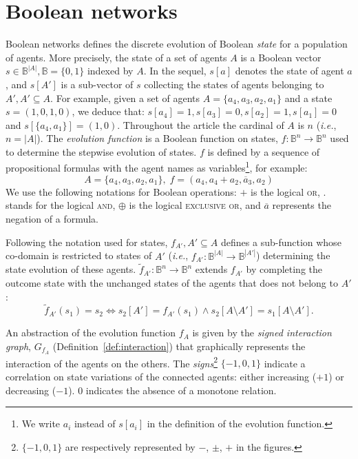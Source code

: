 \documentclass[12pt]{elsarticle}
\newcommand{\Bset}[0]{\mathbb{B}}
\newcommand{\abbrev}[1]{#1, \relax}
\newcommand{\ie}[0]{\abbrev{\textit{i.e.}}}
\renewcommand{\land}[0]{.}
\renewcommand{\lor}[0]{+}
\renewcommand{\lnot}[1]{\overline{#1}}
\newcommand{\lxor}[0]{\oplus}
\begin{document}
\section{Boolean networks}
\label{sec:discrete-dynamics}
Boolean networks defines the discrete evolution of Boolean \emph{state} for a population of agents. More precisely, the state of a set of agents $A$ is a Boolean vector $s \in \Bset^{|A|}, \Bset=\{0,1\}$ indexed by $A$. In the sequel, $s[a]$ denotes the state of agent $a$, and $s[A']$ is a sub-vector of $s$ collecting the states of agents belonging to $A', A' \subseteq A$. For example, given a set of agents $A=\{a_4,a_3,a_2,a_1\}$ and a state $s=(1,0,1,0)$, we deduce that: $s[a_4]=1,s[a_3]=0,s[a_2]=1,s[a_1]=0$ and $s[\{a_4,a_1\}]=(1,0)$. Throughout the article the cardinal of $A$ is $n$ (\ie $n=|A|$). The \emph{ evolution function} is a Boolean function on states, $f:\Bset^{n} \to \Bset^{n}$ used to determine the stepwise evolution of states. $f$ is  defined by a sequence of propositional formulas with the agent names as variables\footnote{We write $a_i$ instead of $s[a_i]$ in the definition of the evolution function.}, for example:
\begin{equation}
\label{eq:ex1}
A = \{a_4,a_3,a_2,a_1\}, \; f=(a_4,a_4 \lor a_2, \lnot a_3, a_2)
\end{equation}
We use the following notations for Boolean operations: $\lor$ is the logical \textsc{or}, $\land$ stands for the logical \textsc{and}, $\lxor$ is the logical \textsc{exclusive or}, and $\lnot{a}$ represents the negation of a formula.

Following the notation used for states, $f_{A'}, A'\subseteq A$ defines a sub-function whose co-domain is restricted to states of $A' $ (\ie $f_{A'}:\Bset^{|A|}\to \Bset^{|A'|}$) determining the state evolution of these agents. $\tilde f_{A'}: \Bset^n \to \Bset^n$ extends $f_{A'}$ by completing the outcome state with the unchanged states of the agents that does not belong to $A'$:
\begin{equation*}
\tilde f_{A'}(s_1) = s_2 \iff s_2[A']=f_{A'}(s_1) \wedge s_2[A\setminus A'] = s_1[A \setminus A'].
\end{equation*} 

An abstraction of the evolution function $f_A$ is given by the \emph{signed interaction graph}, $G_{f_A}$ (Definition~\ref{def:interaction}) that graphically represents the interaction of the agents on the others. The \emph{signs}\footnote{$\{-1,0,1\}$ are respectively represented by $-$, $\pm$, $+$ in the figures.} $\{-1,0,1\}$ indicate a correlation on state variations of the connected agents: either increasing ($+1$) or decreasing ($-1$). $0$ indicates the absence of a monotone relation.
\end{document}
